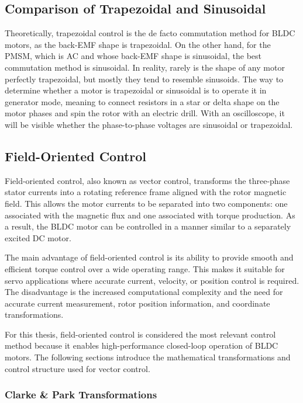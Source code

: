 \subsection{Comparison of Trapezoidal and Sinusoidal}
Theoretically, trapezoidal control is the de facto commutation method for BLDC motors, as the back-EMF shape is trapezoidal. On the other hand, for the PMSM, which is AC and whose back-EMF shape is sinusoidal, the best commutation method is sinusoidal. In reality, rarely is the shape of any motor perfectly trapezoidal, but mostly they tend to resemble sinusoids. The way to determine whether a motor is trapezoidal or sinusoidal is to operate it in generator mode, meaning to connect resistors in a star or delta shape on the motor phases and spin the rotor with an electric drill. With an oscilloscope, it will be visible whether the phase-to-phase voltages are sinusoidal or trapezoidal.

\subsection{Field-Oriented Control}
\label{sec:field-oriented-control}

Field-oriented control, also known as vector control, transforms the three-phase stator currents into a rotating reference frame aligned with the rotor magnetic field. This allows the motor currents to be separated into two components: one associated with the magnetic flux and one associated with torque production. As a result, the BLDC motor can be controlled in a manner similar to a separately excited DC motor.

The main advantage of field-oriented control is its ability to provide smooth and efficient torque control over a wide operating range. This makes it suitable for servo applications where accurate current, velocity, or position control is required. The disadvantage is the increased computational complexity and the need for accurate current measurement, rotor position information, and coordinate transformations.

For this thesis, field-oriented control is considered the most relevant control method because it enables high-performance closed-loop operation of BLDC motors. The following sections introduce the mathematical transformations and control structure used for vector control.

\subsubsection{Clarke \& Park Transformations}


